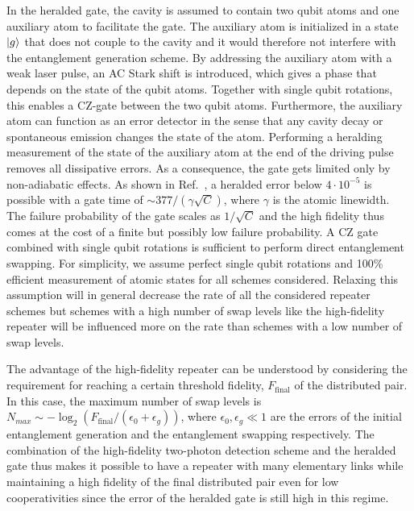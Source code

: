 In the heralded gate, the cavity is assumed to contain two qubit atoms and one
auxiliary atom to facilitate the gate. The auxiliary atom is initialized in a
state $| g \rangle$ that does not couple to the cavity and it would therefore not
interfere with the entanglement generation scheme. By addressing the auxiliary
atom with a weak laser pulse, an AC Stark shift is introduced, which gives a
phase that depends on the state of the qubit atoms. Together with single qubit
rotations, this enables a CZ-gate between the two qubit atoms. Furthermore, the
auxiliary atom can function as an error detector in the sense that any cavity
decay or spontaneous emission changes the state of the atom. Performing a
heralding measurement of the state of the auxiliary atom at the end of the
driving pulse removes all dissipative errors. As a consequence, the gate gets
limited only by non-adiabatic effects. As shown in Ref.~\cite{Borregaard2015a}, a
heralded error below $4\cdot10^{-5}$ is possible with a gate time of
$\sim377/(\gamma\sqrt{C})$, where $\gamma$ is the atomic linewidth. The failure
probability of the gate scales as $1/\sqrt{C}$ and the high fidelity thus comes
at the cost of a finite but possibly low failure probability. A CZ gate combined
with single qubit rotations is sufficient to perform direct entanglement
swapping. For simplicity, we assume perfect single qubit rotations and 100\%
efficient measurement of atomic states for all schemes considered. Relaxing this
assumption will in general decrease the rate of all the considered repeater
schemes but schemes with a high number of swap levels like the high-fidelity
repeater will be influenced more on the rate than schemes with a low number of
swap levels.

The advantage of the high-fidelity repeater can be understood by considering the
requirement for reaching a certain threshold fidelity, $F_{\text{final}}$ of the
distributed pair. In this case, the maximum number of swap levels is
$N_{max}\sim -\log_{2}(F_{\text{final}}/(\epsilon_{0}+\epsilon_{g}))$, where
$\epsilon_{0},\epsilon_{g}\ll1$ are the errors of the initial entanglement
generation and the entanglement swapping respectively. The combination of the
high-fidelity two-photon detection scheme and the heralded gate thus makes it
possible to have a repeater with many elementary links while maintaining a high
fidelity of the final distributed pair even for low cooperativities since the
error of the heralded gate is still high in this regime.

